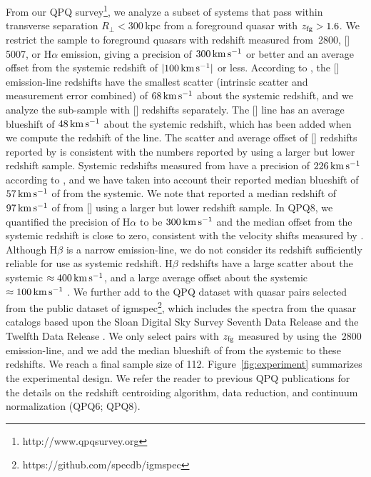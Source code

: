 \documentclass[iop]{emulateapj}
\begin{document}
From our QPQ survey\footnote{http://www.qpqsurvey.org}, we analyze a subset of systems that 
pass within transverse separation $R_\perp<300$\,kpc from a foreground quasar with 
$z_{\rm fg} > 1.6$. We restrict the sample to foreground quasars with redshift measured from 
\,2800, []\,5007, or H$\alpha$ emission, giving a precision of 
$300\,{\rm km\,s^{-1}}$ or better and an average offset from the systemic redshift of 
$|100\,{\rm km\,s^{-1}}|$ or less. According to \cite{Shen+16}, the [] emission-line 
redshifts have the smallest scatter (intrinsic scatter and measurement error combined) of 
$68\,{\rm km\,s^{-1}}$ about the systemic redshift, and we analyze the sub-sample with 
[] redshifts separately. The [] line has an average blueshift of 
$48\,{\rm km\,s^{-1}}$ about the systemic redshift, which has been added when we compute the 
redshift of the line. The scatter and average offset of [] redshifts reported by 
\cite{Shen+16} is consistent with the numbers reported by \cite{Boroson05} using a larger but 
lower redshift sample. Systemic redshifts measured from  have a precision of 
$226\,{\rm km\,s^{-1}}$ according to \cite{Shen+16}, and we have taken into account their 
reported median blueshift of $57\,{\rm km\,s^{-1}}$ of  from the systemic. We note that 
\cite{Richards+02} reported a median redshift of $97\,{\rm km\,s^{-1}}$ of  from 
[] using a larger but lower redshift sample. In QPQ8, we quantified 
the precision of H$\alpha$ to be $300\,{\rm km\,s^{-1}}$ and the median offset from the systemic 
redshift is close to zero, consistent with the velocity shifts measured by \cite{Shen+11}. 
Although H$\beta$ is a narrow emission-line, we do not consider its redshift sufficiently reliable 
for use as systemic redshift. H$\beta$ redshifts have a large scatter about the systemic 
$\approx400\,{\rm km\,s^{-1}}$, and a large average offset about the systemic 
$\approx100\,{\rm km\,s^{-1}}$ \citep[][QPQ8]{Shen+16}. 
We further add to the QPQ dataset with quasar pairs selected from the public dataset of 
igmspec\footnote{https://github.com/specdb/igmspec}, which includes the spectra from the quasar 
catalogs based upon the Sloan Digital Sky Survey Seventh Data Release \citep{Schneider+10} and the 
Twelfth Data Release \citep{Paris+17}. We only select pairs with $z_{\rm fg}$ measured by 
\cite{HewettWild10} using the \,2800 emission-line, and we add the median blueshift of 
 from the systemic to these redshifts. We reach a final sample size of 112. 
Figure~\ref{fig:experiment} summarizes the experimental design. We refer the reader to previous 
QPQ publications for the details on the redshift centroiding algorithm, data reduction, and 
continuum normalization (QPQ6; QPQ8). 
\end{document}
